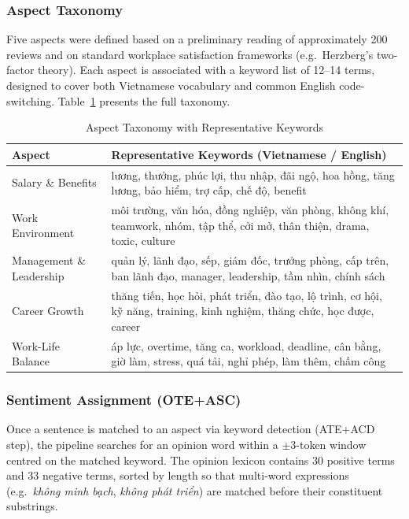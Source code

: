 \documentclass[12pt, a4paper]{article}
\begin{document}
\subsubsection{Aspect Taxonomy}

Five aspects were defined based on a preliminary reading of approximately 200 reviews and on standard workplace satisfaction frameworks (e.g.\ Herzberg's two-factor theory). Each aspect is associated with a keyword list of 12--14 terms, designed to cover both Vietnamese vocabulary and common English code-switching. Table~\ref{tab:aspects} presents the full taxonomy.

\begin{table}[H]
\centering
\caption{Aspect Taxonomy with Representative Keywords}
\label{tab:aspects}
\begin{tabular}{p{3.8cm} p{9cm}}
\toprule
\textbf{Aspect} & \textbf{Representative Keywords (Vietnamese / English)} \\
\midrule
Salary \& Benefits & lương, thưởng, phúc lợi, thu nhập, đãi ngộ, hoa hồng, tăng lương, bảo hiểm, trợ cấp, chế độ, benefit \\
\addlinespace
Work Environment & môi trường, văn hóa, đồng nghiệp, văn phòng, không khí, teamwork, nhóm, tập thể, cởi mở, thân thiện, drama, toxic, culture \\
\addlinespace
Management \& Leadership & quản lý, lãnh đạo, sếp, giám đốc, trưởng phòng, cấp trên, ban lãnh đạo, manager, leadership, tầm nhìn, chính sách \\
\addlinespace
Career Growth & thăng tiến, học hỏi, phát triển, đào tạo, lộ trình, cơ hội, kỹ năng, training, kinh nghiệm, thăng chức, học được, career \\
\addlinespace
Work-Life Balance & áp lực, overtime, tăng ca, workload, deadline, cân bằng, giờ làm, stress, quá tải, nghỉ phép, làm thêm, chấm công \\
\bottomrule
\end{tabular}
\end{table}

\subsubsection{Sentiment Assignment (OTE+ASC)}

Once a sentence is matched to an aspect via keyword detection (ATE+ACD step), the pipeline searches for an opinion word within a $\pm$3-token window centred on the matched keyword. The opinion lexicon contains 30 positive terms and 33 negative terms, sorted by length so that multi-word expressions (e.g.\ \textit{không minh bạch}, \textit{không phát triển}) are matched before their constituent substrings.
\end{document}
